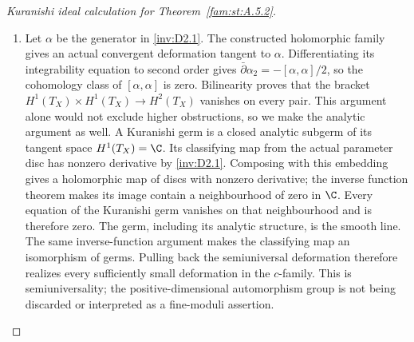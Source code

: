 \begin{proof}[Kuranishi ideal calculation for Theorem~\ref{fam:st:A.5.2}]
\begin{enumerate}[label=\arabic*.,leftmargin=*]
\item Let $\alpha$ be the generator in \ref{inv:D2.1}. The constructed holomorphic
family gives an actual convergent deformation tangent to $\alpha$.
Differentiating its integrability equation to second order gives
$\bar\partial\alpha_2=-[\alpha,\alpha]/2$, so the cohomology class
of $[\alpha,\alpha]$ is zero. Bilinearity proves that the bracket
$H^1(T_X)\times H^1(T_X)\to H^2(T_X)$ vanishes on every pair.
This argument alone would not exclude higher obstructions, so we
make the analytic argument as well. A Kuranishi germ is a closed
analytic subgerm of its tangent space $H^1(T_X)=\C$. Its classifying
map from the actual parameter disc has nonzero derivative by \ref{inv:D2.1}.
Composing with this embedding gives a holomorphic map of discs with
nonzero derivative; the inverse function theorem makes its image
contain a neighbourhood of zero in $\C$. Every equation of the
Kuranishi germ vanishes on that neighbourhood and is therefore zero.
The germ, including its analytic structure, is the smooth line.
The same inverse-function argument makes the classifying map an
isomorphism of germs. Pulling back the semiuniversal deformation
therefore realizes every sufficiently small deformation in the
$c$-family. This is semiuniversality; the positive-dimensional
automorphism group is not being discarded or interpreted as a
fine-moduli assertion.
\end{enumerate}
\end{proof}



